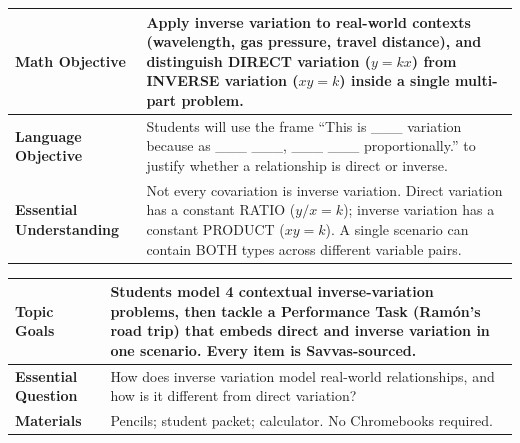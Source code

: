 \documentclass[11pt]{article}
\begin{document}

{\small
\renewcommand{\arraystretch}{1.25}
\noindent\begin{tabular}{|p{1.8in}|p{4.8in}|}
\hline
\textbf{Math Objective} & Apply inverse variation to real-world contexts (wavelength, gas pressure, travel distance), and distinguish DIRECT variation (\(y = kx\)) from INVERSE variation (\(xy = k\)) inside a single multi-part problem. \\ \hline
\textbf{Language Objective} & Students will use the frame “This is \_\_\_ variation because as \_\_\_ \_\_\_, \_\_\_ \_\_\_ proportionally.” to justify whether a relationship is direct or inverse. \\ \hline
\textbf{Essential Understanding} & Not every covariation is inverse variation. Direct variation has a constant RATIO (\(y/x = k\)); inverse variation has a constant PRODUCT (\(xy = k\)). A single scenario can contain BOTH types across different variable pairs. \\ \hline
\end{tabular}
}

{\small
\renewcommand{\arraystretch}{1.25}
\noindent\begin{tabular}{|p{1.8in}|p{4.8in}|}
\hline
\textbf{Topic Goals} & Students model 4 contextual inverse-variation problems, then tackle a Performance Task (Ramón's road trip) that embeds direct and inverse variation in one scenario. Every item is Savvas-sourced. \\ \hline
\textbf{Essential Question} & How does inverse variation model real-world relationships, and how is it different from direct variation? \\ \hline
\textbf{Materials} & Pencils; student packet; calculator. No Chromebooks required. \\ \hline
\end{tabular}
}

\end{document}
